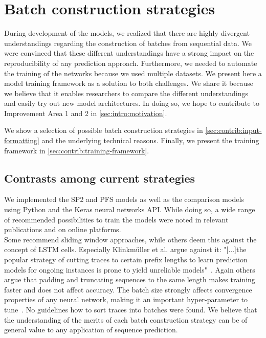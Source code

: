 \chapter{Batch construction strategies}\label{chap:training-framework}
During development of the models, we realized that there are highly divergent understandings regarding the construction of batches from sequential data.
We were convinced that these different understandings have a strong impact on the reproducibility of any prediction approach.
Furthermore, we needed to automate the training of the networks because we used multiple datasets.
We present here a model training framework as a solution to both challenges.
We share it because we believe that it enables researchers to compare the different understandings and easily try out new model architectures.
In doing so, we hope to contribute to Improvement Area 1 and 2 in \autoref{sec:intro:motivation}.

We show a selection of possible batch construction strategies in \autoref{sec:contrib:input-formatting} and the underlying technical reasons. Finally, we present the training framework in \autoref{sec:contrib:training-framework}.

\section{Contrasts among current strategies}\label{sec:contrib:input-formatting}
We implemented the SP2 and PFS models as well as the comparison models using Python and the Keras neural networks API.
While doing so, a wide range of recommended possibilities to train the models were noted in relevant publications and on online platforms.\\

Some recommend sliding window approaches, while others deem this against the concept of LSTM cells.
Especially Klinkmüller et al. argue against it: "[...]the popular strategy of cutting traces to certain prefix lengths to learn prediction models for ongoing instances is prone to yield unreliable models"~\cite{klinkmuller2018reliablemonitoring}.
Again others argue that padding and truncating sequences to the same length makes training faster and does not affect accuracy.
The batch size strongly affects convergence properties of any neural network, making it an important hyper-parameter to tune~\cite{keskar2016large}.
No guidelines how to sort traces into batches were found.
We believe that the understanding of the merits of each batch construction strategy can be of general value to any application of sequence prediction.\\


